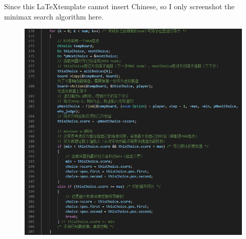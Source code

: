 ﻿\documentclass[a4paper, 11pt]{article}
\begin{document}
Since this \LaTeX template cannot insert Chinese, so I only screenshot the minimax search algorithm here.
\begin{figure}[H]
  \centering
  \includegraphics[width=\linewidth]{fig/code.png}
\end{figure}
\end{document}
